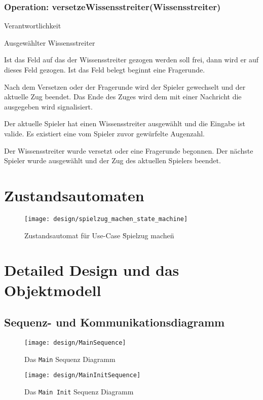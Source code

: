 \subsubsection{Operation: versetzeWissensstreiter(Wissensstreiter)}
\begin{labeling}[:]{Verantwortlichkeit}
\item [Parameter] Ausgewählter Wissensstreiter
\item [Verantwortlichkeit] Ist das Feld auf das der Wissensstreiter gezogen werden soll frei, dann wird er auf dieses Feld gezogen. Ist das Feld belegt beginnt eine Fragerunde.

Nach dem Versetzen oder der Fragerunde wird der Spieler gewechselt und der aktuelle Zug beendet. Das Ende des Zuges wird dem mit einer Nachricht die ausgegeben wird signalisiert.

\item [Ausnahmen]
\item [Vorbedingungen] Der aktuelle Spieler hat einen Wissensstreiter ausgewählt und die Eingabe ist valide. Es existiert eine vom Spieler zuvor gewürfelte Augenzahl.
\item [Nachbedingungen] Der Wissensstreiter wurde versetzt oder eine Fragerunde begonnen. Der nächste Spieler wurde ausgewählt und der Zug des aktuellen Spielers beendet.
\end{labeling}

\section{Zustandsautomaten}
\begin{figure}[h]
  \begin{center}
    \texttt{[image: design/spielzug\_machen\_state\_machine]}
    \caption{Zustandsautomat für Use-Case \"Spielzug machen\"}
  \end{center}
\end{figure}
\newpage

\section{Detailed Design und das Objektmodell}
\subsection{Sequenz- und Kommunikationsdiagramm}
\begin{figure}[h]
    \texttt{[image: design/MainSequence]}
    \caption{Das \texttt{Main} Sequenz Diagramm}
\end{figure}
\newpage
\begin{figure}[h]
  \begin{center}
    \texttt{[image: design/MainInitSequence]}
    \caption{Das \texttt{Main Init} Sequenz Diagramm}
  \end{center}
\end{figure}
\newpage


